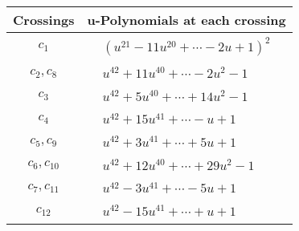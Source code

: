 \documentclass[1p]{elsarticle_modified}
\theoremstyle{definition}
\begin{document}
\begin{tabular}{m{50pt}|m{274pt}}
Crossings & \hspace{64pt}u-Polynomials at each crossing \\
\hline $$\begin{aligned}c_{1}\end{aligned}$$&$\begin{aligned}
&(u^{21}-11 u^{20}+\cdots-2 u+1)^{2}
\end{aligned}$\\
\hline $$\begin{aligned}c_{2},c_{8}\end{aligned}$$&$\begin{aligned}
&u^{42}+11 u^{40}+\cdots-2 u^2-1
\end{aligned}$\\
\hline $$\begin{aligned}c_{3}\end{aligned}$$&$\begin{aligned}
&u^{42}+5 u^{40}+\cdots+14 u^2-1
\end{aligned}$\\
\hline $$\begin{aligned}c_{4}\end{aligned}$$&$\begin{aligned}
&u^{42}+15 u^{41}+\cdots- u+1
\end{aligned}$\\
\hline $$\begin{aligned}c_{5},c_{9}\end{aligned}$$&$\begin{aligned}
&u^{42}+3 u^{41}+\cdots+5 u+1
\end{aligned}$\\
\hline $$\begin{aligned}c_{6},c_{10}\end{aligned}$$&$\begin{aligned}
&u^{42}+12 u^{40}+\cdots+29 u^2-1
\end{aligned}$\\
\hline $$\begin{aligned}c_{7},c_{11}\end{aligned}$$&$\begin{aligned}
&u^{42}-3 u^{41}+\cdots-5 u+1
\end{aligned}$\\
\hline $$\begin{aligned}c_{12}\end{aligned}$$&$\begin{aligned}
&u^{42}-15 u^{41}+\cdots+u+1
\end{aligned}$\\
\hline
\end{tabular}\\~\\
\end{document}
